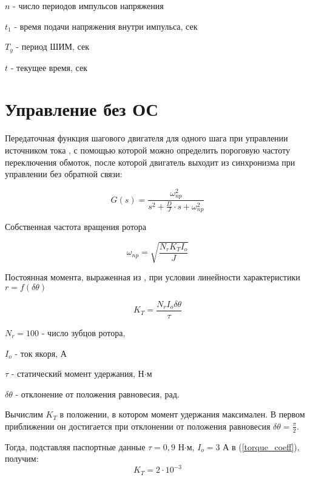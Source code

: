 $n$ - число периодов импульсов напряжения

$t_{1}$ - время подачи напряжения внутри импульса, сек

$T_{y}$ - период ШИМ, сек

$t$ - текущее время, сек

\newpage
\part{ Управление без ОС }

Передаточная функция шагового двигателя для одного шага при управлении источником тока \cite[гл. 4.2, ф-ла 4.65]{Kenio}, с помощью которой можно определить пороговую частоту переключения обмоток, после которой двигатель выходит из синхронизма при управлении без обратной связи:

\begin{equation}
    \label{step_motor_transfer_function}
    G(s) = \frac{ \omega_{np}^{2} }
                { s^{2} + \frac{D}{J} \cdot s + \omega_{np}^{2} }

\end{equation}

Собственная частота вращения ротора \cite[гл. 4.2, ф-ла 4.48]{Kenio}

\begin{equation}
    \label{rotor_natural_frequency}
    \omega_{np} = \sqrt{\frac{N_{r}K_{T}I_{o}}{J}}
\end{equation}

Постоянная момента, выраженная из \cite[гл. 4.2, ф-ла 4.52]{Kenio}, при условии линейности характеристики $r = f(\delta\theta)$

\begin{equation}
    \label{torque_coeff}
    K_{T} = \frac{N_{r}I_{o}\delta\theta}{\tau}
\end{equation}

$N_{r} = 100$ - число зубцов ротора,

$I_{o}$ - ток якоря, А

$\tau$ - статический момент удержания, Н$\cdot$м

$\delta\theta$ - отклонение от положения равновесия, рад.
\newline\newline

Вычислим $K_{T}$ в положении, в котором момент удержания максимален. В первом приближении он достигается при отклонении от положения равновесия $\delta\theta = \frac{\pi}{2}$.

Тогда, подставляя паспортные данные $\tau = 0,9$ Н$\cdot$м, $I_{o} = 3$ А в (\ref{torque_coeff}), получим:
\begin{equation}
    \label{first_approximation_moment_coeff}
    K_{T} = 2\cdot10^{-3}
\end{equation}

